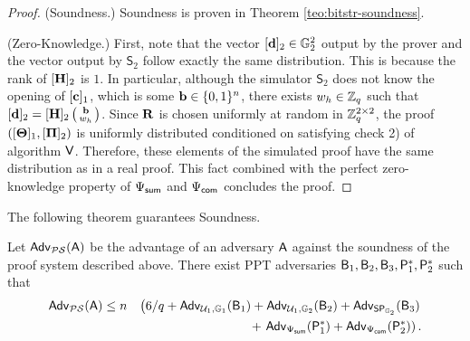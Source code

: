\begin{proof}
(Soundness.) Soundness is proven in Theorem \ref{teo:bitstr-soundness}.

(Zero-Knowledge.) First, note that the vector $[\mathbf{d}]_2 \in \mathbb{G}_2^2$ output by the prover and the vector output by $\mathsf{S}_2$ follow exactly the same distribution. This is because the rank of $[{\mathbf{{H}}}]_2$ is $1$. In particular, although the simulator $\mathsf{S}_2$ does not know the opening of $[\mathbf{c}]_1$, which is some $\mathbf{b} \in \{0,1\}^{n}$, 
there exists $w_h \in \mathbb{Z}_q$ such that $[\mathbf{d}]_2=[{\mathbf{{H}}}]_2\left(\begin{smallmatrix}\mathbf{b}\\ w_h\end{smallmatrix}\right)$. 
Since $\mathbf{{R}}$ is chosen uniformly at random in $\mathbb{Z}_q^{2 \times 2}$, the proof $([\mathbf{{\Theta}}]_1, [\mathbf{{\Pi}}]_2)$ is uniformly distributed conditioned on satisfying check 2) of algorithm $\mathsf{V}$.
Therefore, these elements of the simulated proof have the same distribution as in a real proof. This fact combined with the perfect zero-knowledge property of ${\Psi_{\mathsf{sum}}}$  and ${\Psi_{\mathsf{com}}}$ concludes the proof. 
\end{proof}

The following theorem guarantees Soundness. 
 
\begin{theorem} Let $\mathsf{Adv}_{\mathcal{PS}}(\mathsf{A})$ 
be the advantage of an adversary $\mathsf{A}$ against the soundness of 
the proof system  described above. There exist PPT adversaries
$\mathsf{B}_1,\mathsf{B}_2,\mathsf{B}_3,\mathsf{P}^*_1,\mathsf{P}^*_2$ such that 
\begin{eqnarray*}
\mathsf{Adv}_{\mathcal{PS}}(\mathsf{A}) & \leq 
n& \left(6/q+ \mathsf{Adv}_{\mathcal{U}_1,\mathbb{G}_1}(\mathsf{B}_1)
+  \mathsf{Adv}_{\mathcal{U}_1,\mathbb{G}_2}(\mathsf{B}_2)
+  \mathsf{Adv}_{\mathsf{SP}_{\mathbb{G}_2}}(\mathsf{B}_3)\right. \\
& & \mbox{ } 
+  \left.\mathsf{Adv}_{{\Psi_{\mathsf{sum}}}}(\mathsf{P}^*_1)
+
 \mathsf{Adv}_{{\Psi_{\mathsf{com}}}}(\mathsf{P}^*_2)\right).
\end{eqnarray*}
\label{teo:bitstr-soundness}
\end{theorem}

